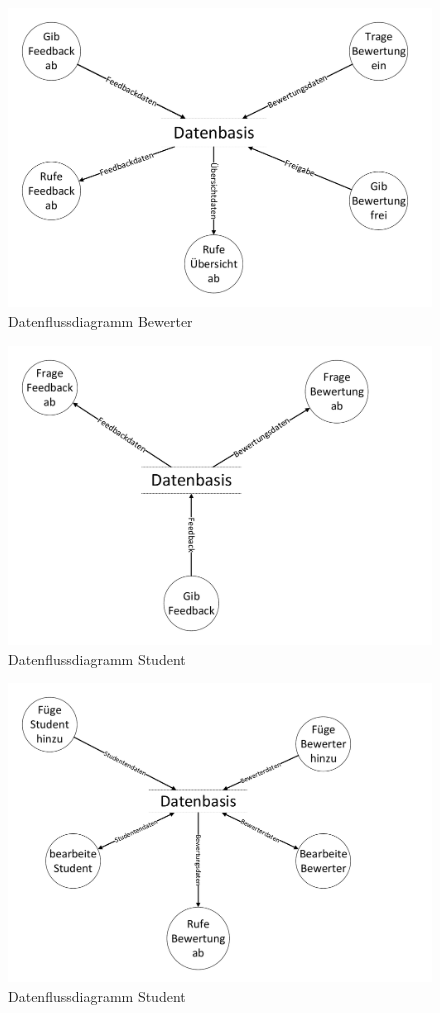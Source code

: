 \documentclass[a4paper,listof=leveldown,listof=numbered]{scrreprt}
\begin{document}
	\begin{figure}[H]
		\centering
		\includegraphics[width=1.4\textwidth, angle=90, origin=c]{../Diagramme/Kontextdiagramm_DFD2_Bewerter.pdf}
		\caption{Datenflussdiagramm Bewerter}
	\end{figure}
	\begin{figure}[H]
		\centering
		\includegraphics[width=1.4\textwidth, angle=90, origin=c]{../Diagramme/Kontextdiagramm_DFD2_Student.pdf}
		\caption{Datenflussdiagramm Student}
	\end{figure}
	\begin{figure}[H]
		\centering
		\includegraphics[width=1.4\textwidth, angle=90, origin=c]{../Diagramme/Kontextdiagramm_DFD2_Verwalter.pdf}
		\caption{Datenflussdiagramm Student}
	\end{figure}
	
	
	
	\listoftables
		
\end{document}
